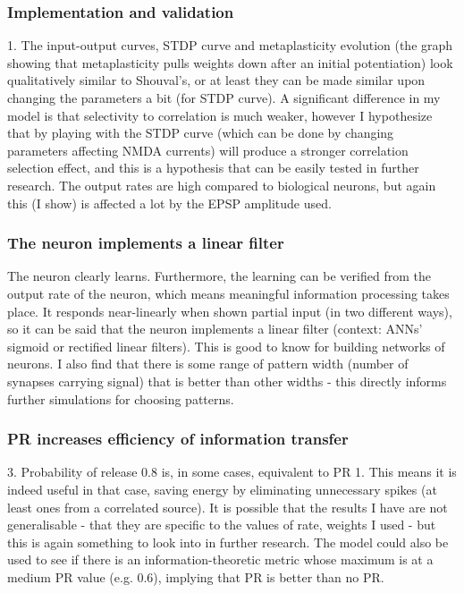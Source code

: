 \documentclass[a4paper,12pt]{report}
\theoremstyle{definition}
\begin{document}


\subsubsection{Implementation and validation}
1. The input-output curves, STDP curve and metaplasticity evolution (the graph showing that metaplasticity pulls weights down after an initial potentiation) look qualitatively similar to Shouval's, or at least they can be made similar upon changing the parameters a bit (for STDP curve). A significant difference in my model is that selectivity to correlation is much weaker, however I hypothesize that by playing with the STDP curve (which can be done by changing parameters affecting NMDA currents) will produce a stronger correlation selection effect, and this is a hypothesis that can be easily tested in further research. The output rates are high compared to biological neurons, but again this (I show) is affected a lot by the EPSP amplitude used.

\subsubsection{The neuron implements a linear filter}
The neuron clearly learns. Furthermore, the learning can be verified from the output rate of the neuron, which means meaningful information processing takes place. It responds near-linearly when shown partial input (in two different ways), so it can be said that the neuron implements a linear filter (context: ANNs' sigmoid or rectified linear filters). This is good to know for building networks of neurons.
I also find that there is some range of pattern width (number of synapses carrying signal) that is better than other widths - this directly informs further simulations for choosing patterns.

\subsubsection{PR increases efficiency of information transfer}
3. Probability of release 0.8 is, in some cases, equivalent to PR 1. This means it is indeed useful in that case, saving energy by eliminating unnecessary spikes (at least ones from a correlated source). It is possible that the results I have are not generalisable - that they are specific to the values of  {rate, weights} I used - but this is again something to look into in further research. The model could also be used to see if there is an information-theoretic metric whose maximum is at a medium PR value (e.g. 0.6), implying that PR is better than no PR.
\end{document}
